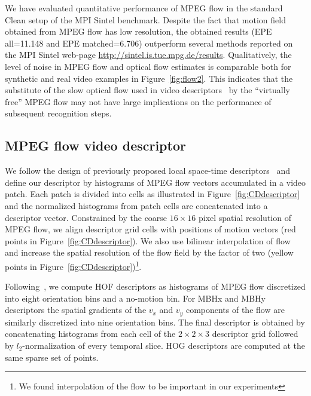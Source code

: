 \documentclass[10pt,twocolumn,letterpaper]{article}
\begin{document}
We have evaluated quantitative performance of MPEG flow in the standard Clean setup of the MPI Sintel benchmark. Despite the fact that motion field obtained from MPEG flow has low resolution, the obtained results (EPE all=11.148 and EPE matched=6.706) outperform several methods reported on the MPI Sintel web-page {\small \url{http://sintel.is.tue.mpg.de/results}}. Qualitatively, the level of noise in MPEG flow and optical flow estimates is comparable both for synthetic and real video examples in Figure~\ref{fig:flow2}. This indicates that the substitute of the slow optical flow used in video descriptors~\cite{Laptev08,Wang12} by the ``virtually free'' MPEG flow may not have large implications on the performance of subsequent recognition steps.





%
%




\subsection{MPEG flow video descriptor}
\label{sec:CDdescriptor}

We follow the design of previously proposed local space-time descriptors~\cite{Laptev08,Wang12} and define our descriptor by histograms of MPEG flow vectors accumulated in a video patch. Each patch is divided into cells as illustrated in Figure~\ref{fig:CDdescriptor} and the normalized histograms from patch cells are concatenated into a descriptor vector. Constrained by the coarse $16\times16$ pixel spatial resolution of MPEG flow, we align descriptor grid cells with positions of motion vectors (red points in Figure~\ref{fig:CDdescriptor}). We also use bilinear interpolation of flow and increase the spatial resolution of the flow field by the factor of two (yellow points in Figure~\ref{fig:CDdescriptor})\footnote{We found interpolation of the flow to be important in our experiments}. 

Following~\cite{Wang12}, we compute HOF descriptors as histograms of MPEG flow discretized into eight orientation bins and a no-motion bin. For MBHx and MBHy descriptors the spatial gradients of the $v_x$ and $v_y$ components of the flow are similarly discretized into nine orientation bins. %
The final descriptor is obtained by concatenating histograms from each cell of the $2\times2\times3$ descriptor grid followed by $l_2$-normalization of every temporal slice. HOG descriptors are computed at the same sparse set of points.
\end{document}
